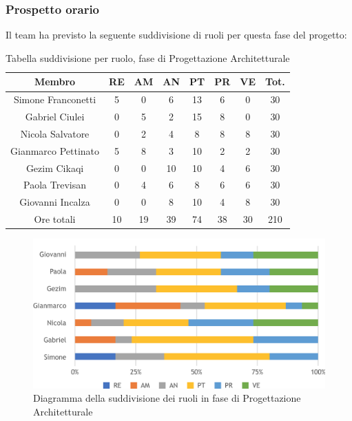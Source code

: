\subsubsection{Prospetto orario}
Il team ha previsto la seguente suddivisione di ruoli per questa fase del progetto:
\\
\begin{table}[h]
\caption{Tabella suddivisione per ruolo, fase di Progettazione Architetturale}  
\begin{center}
\begin{tabular}{ |c|c|c|c|c|c|c|c|  }
 \hline
 Membro 		& RE 	& AM 	& AN 	& PT 	& PR 	& VE 	& Tot.\\
 \hline\hline
 Simone	Franconetti		& 5 		& 0		& 6 	& 13 	& 6 		& 0 		& 30\\
 Gabriel Ciulei		& 0 		& 5 		& 2 	& 15		& 8 		& 0 		& 30\\
 Nicola	Salvatore		& 0 		& 2 		& 4 	& 8		& 8 		& 8 		& 30\\
 Gianmarco	Pettinato	& 5 		& 8 		& 3 	& 10 	& 2 		& 2 		& 30\\
 Gezim	Cikaqi		& 0 		& 0 		& 10 	& 10		& 4 		& 6	 	& 30\\
 Paola	Trevisan		& 0 		& 4 		& 6 	& 8 		& 6 		& 6 		& 30\\
 Giovanni Incalza		& 0 		& 0	 	& 8 	& 10		& 4 		& 8  	& 30\\
 \hline\hline
 Ore totali		& 10		& 19		& 39 	& 74	 	& 38 	& 30 	& 210\\
  \hline
\end{tabular}
\end{center}
\end{table}
\begin{figure}[h!]
	\includegraphics[width=\textwidth]{res/img/hi336}
	\caption{Diagramma della suddivisione dei ruoli in fase di Progettazione Architetturale}
\end{figure}

